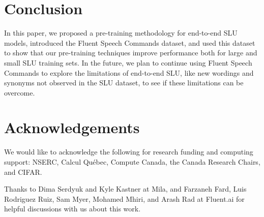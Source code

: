 \documentclass[a4paper]{article}
\begin{document}
\section{Conclusion}
In this paper, we proposed a pre-training methodology for end-to-end SLU models, introduced the Fluent Speech Commands dataset, and used this dataset to show that our pre-training techniques improve performance both for large and small SLU training sets. In the future, we plan to continue using Fluent Speech Commands to explore the limitations of end-to-end SLU, like new wordings and synonyms not observed in the SLU dataset, to see if these limitations can be overcome.

\section{Acknowledgements}

We would like to acknowledge the following for
research funding and computing support: NSERC, Calcul Qu\'{e}bec, Compute Canada,
the Canada Research Chairs, and CIFAR. 

Thanks to Dima Serdyuk and Kyle Kastner at Mila, and Farzaneh Fard, Luis Rodriguez Ruiz, Sam Myer, 	
Mohamed Mhiri, and Arash Rad at Fluent.ai for helpful discussions with us about this work.




\end{document}
